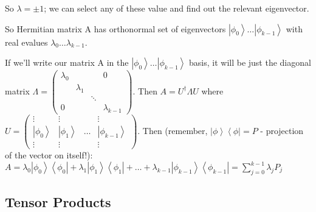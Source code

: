 \documentclass{scrartcl}
\newcommand{\ket}[1]{\left| #1 \right>} %
\newcommand{\bra}[1]{\left< #1 \right|} %
\begin{document}
So $\lambda = \pm 1 $; we can select any of these value and find out the
relevant eigenvector.

So Hermitian matrix A has orthonormal set of eigenvectors $\ket{\phi_0} \dots
\ket{\phi_{k-1}}$ with real evalues $\lambda_0 \dots \lambda_{k-1}$.

If we'll write our matrix A in the $\ket{\phi_0} \dots \ket{\phi_{k-1}}$ basis,
it will be just the diagonal matrix $\Lambda = \begin{pmatrix} \lambda_0 &&&0 \\
  & \lambda_1 && \\ & & \ddots & \\ 0 &&& \lambda_{k-1} \end{pmatrix}$. Then $A
= U^\dag \Lambda U$ where $U= \begin{pmatrix} \vdots & \vdots &&\vdots \\
  \ket{\phi_0} & \ket{\phi_1} & \dots & \ket{\phi_{k-1}} \\ \vdots & \vdots
  &&\vdots \end{pmatrix}$. Then (remember, $\ket\phi \bra\phi = P$ - projection
of the vector on itself!): $A = \lambda_0 \ket{\phi_0}\bra{\phi_0} + \lambda_1
\ket{\phi_1}\bra{\phi_1} + \dots + \lambda_{k-1}
\ket{\phi_{k-1}}\bra{\phi_{k-1}} = \sum \limits_{j=0}^{k-1}\lambda_j P_j$

\subsection{Tensor Products}
\label{sec:7-4}
\end{document}
